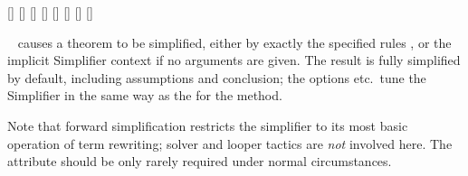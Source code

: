\begin{isabellebody}
\begin{isamarkuptext}
  \begin{railoutput}
[]
\rail@bar
{}
[]
\rail@endbar
\rail@bar
{}
[]
\rail@endbar
\rail@end
{}
[]
\rail@bar
{}[]
[]
[]
\rail@endbar
{}[]
\rail@end
\end{railoutput}


  \begin{description}
  
  \item \hyperlink{attribute.simplified}{\mbox{}}~ causes a theorem to
  be simplified, either by exactly the specified rules , or the implicit Simplifier context if no arguments are given.
  The result is fully simplified by default, including assumptions and
  conclusion; the options  etc.\ tune the Simplifier in
  the same way as the for the  method.

  Note that forward simplification restricts the simplifier to its
  most basic operation of term rewriting; solver and looper tactics
  \cite{isabelle-ref} are \emph{not} involved here.  The  attribute should be only rarely required under normal
  circumstances.


\end{description}
\end{isamarkuptext}
\end{isabellebody}
